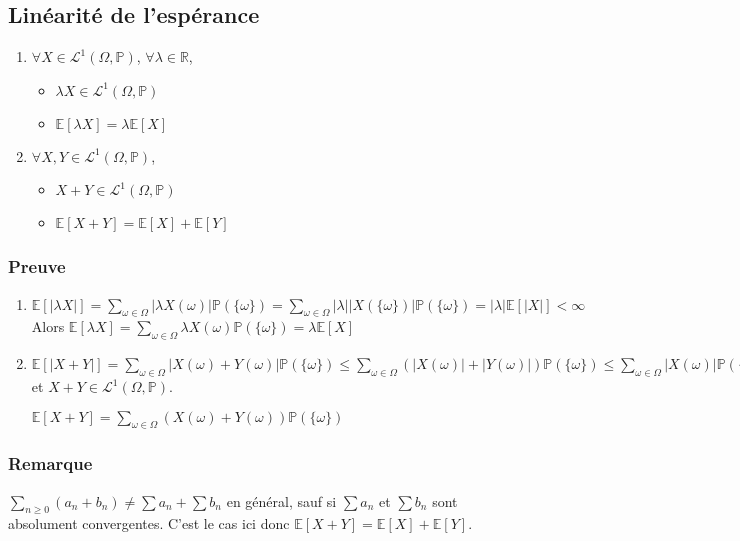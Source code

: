 \documentclass[a4paper,10pt]{book} %
\newcommand{\R}{\mathbb{R}}
\newcommand{\E}{\mathbb{E}} %
\renewcommand{\P}{\mathbb{P}} %
\newcommand\abs[1]{\left|#1\right|}
\begin{document}
\subsection{Linéarité de l'espérance}
\begin{enumerate}
\item $\forall X\in \mathcal{L}^1(\Omega,\P)$, $\forall \lambda\in \R$, 
\begin{itemize}
\item $\lambda X\in \mathcal{L}^1(\Omega,\P)$
\item $\E[\lambda X]=\lambda \E[X]$
\end{itemize}
\item $\forall X,Y \in \mathcal{L}^1(\Omega,\P)$,
\begin{itemize}
\item $X+Y \in \mathcal{L}^1(\Omega,\P)$
\item $\E[X+Y]=\E[X]+\E[Y]$
\end{itemize}
\end{enumerate}

\subsubsection{Preuve}
\begin{enumerate}
\item $\displaystyle \E[\abs{\lambda X}]=\sum_{\omega\in \Omega}\abs{\lambda X(\omega)}\P(\{\omega\})=\sum_{\omega\in\Omega}\abs{\lambda}\abs{X(\{\omega\})}\P(\{\omega\})=\abs{\lambda}\E[\abs{X}]<\infty$\\

Alors $\displaystyle \E[\lambda X]=\sum_{\omega\in \Omega}\lambda X(\omega)\P(\{\omega\})=\lambda \E[X]$

\item $\displaystyle \E[\abs{X+Y}]=\sum_{\omega\in \Omega}\abs{X(\omega)+Y(\omega)}\P(\{\omega\})\leq \sum_{\omega\in\Omega}(\abs{X(\omega)}+\abs{Y(\omega)})\P(\{\omega\})\leq 
\sum_{\omega\in\Omega}\abs{X(\omega)}\P(\{\omega\})+\sum_{\omega\in\Omega}\abs{Y(\omega)}\P(\{\omega\})<+\infty$ et $X+Y\in \mathcal{L}^1(\Omega,\P)$.

$\displaystyle \E[X+Y]=\sum_{\omega\in \Omega}(X(\omega)+Y(\omega))\P(\{\omega\})$
\end{enumerate}

\subsubsection{Remarque}
$\displaystyle \sum_{n\geq 0}(a_n+b_n)\neq \sum a_n+\sum b_n$ en général, sauf si $\sum a_n$ et $\sum b_n$ sont absolument convergentes. C'est le cas ici donc $\E[X+Y]=\E[X]+\E[Y]$.
\end{document}
